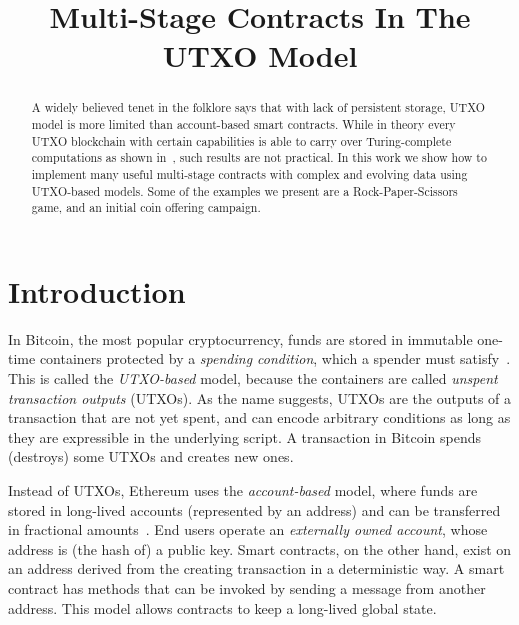 \documentclass[runningheads]{llncs}
\newcommand{\langname}{ErgoScript\xspace}
\begin{document}
\title{Multi-Stage Contracts In The UTXO Model}




\maketitle


\begin{abstract}
A widely believed tenet in the folklore says that with lack of persistent storage, UTXO model is more limited than account-based smart contracts. While in theory every UTXO blockchain with certain capabilities is able to carry over Turing-complete computations as shown in~\cite{CKM18a}, such results are not practical.
In this work we show how to implement many useful multi-stage contracts with complex and evolving data using UTXO-based models. Some of the examples we present are a Rock-Paper-Scissors game, and an initial coin offering campaign.
\end{abstract}

\section{Introduction}

In Bitcoin, the most popular cryptocurrency, funds are stored in immutable one-time containers protected by a {\em spending condition}, which a spender must satisfy~\cite{Nak08}.
This is called the {\em UTXO-based} model, because the containers are called {\em unspent transaction outputs} (UTXOs). As the name suggests, UTXOs are the outputs of a transaction that are not yet spent, and can encode arbitrary conditions as long as they are expressible in the underlying script.
A transaction in Bitcoin spends (destroys) some UTXOs and creates new ones. %

Instead of UTXOs, Ethereum
uses the {\em account-based} model, where funds are stored in long-lived accounts (represented by an address) and can be transferred in fractional amounts~\cite{wood2014ethereum}. End users operate an {\em externally owned account}, whose address is (the hash of) a public key. Smart contracts, on the other hand, exist on an address derived from the creating transaction in a deterministic way. A smart contract has methods that can be invoked by sending a message from another address. 
This model allows contracts to keep a long-lived global state. %
\end{document}
